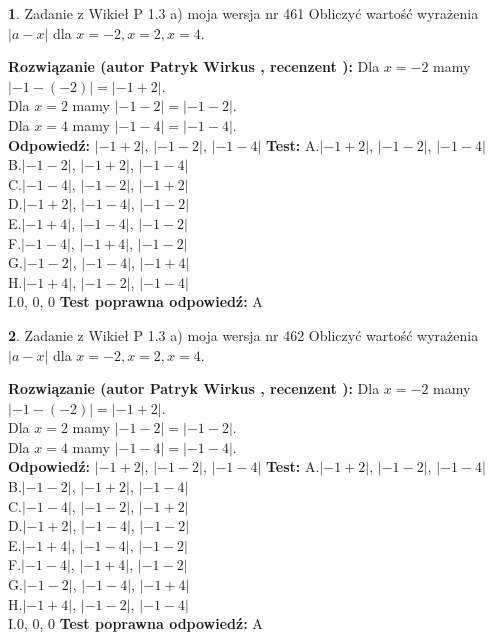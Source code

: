 \documentclass[12pt, a4paper]{article}
\theoremstyle{definition} %
\newtheorem{zad}{}
\newcommand{\zadStart}[1]{\begin{zad}#1\newline}
\newcommand{\zadStop}{\end{zad}}
\newcommand{\rozwStart}[2]{\noindent \textbf{Rozwiązanie (autor #1 , recenzent #2): }\newline}
\newcommand{\rozwStop}{\newline}
\newcommand{\odpStart}{\noindent \textbf{Odpowiedź:}\newline}
\newcommand{\odpStop}{\newline}
\newcommand{\testStart}{\noindent \textbf{Test:}\newline}
\newcommand{\testStop}{\newline}
\newcommand{\kluczStart}{\noindent \textbf{Test poprawna odpowiedź:}\newline}
\newcommand{\kluczStop}{\newline}
\begin{document}
\zadStart{Zadanie z Wikieł P 1.3 a) moja wersja nr 461}
Obliczyć wartość wyrażenia $|a - x|$ dla $x=-2,x=2,x=4$.
\zadStop
\rozwStart{Patryk Wirkus}{}
Dla $x = -2$ mamy $|-1 - (-2)| = |-1 + 2|$.\\
Dla $x = 2$ mamy $|-1 - 2| = |-1 - 2|$.\\
Dla $x = 4$ mamy $|-1 - 4| = |-1 - 4|$.\\
\rozwStop
\odpStart
$|-1 + 2|$, $|-1 - 2|$, $|-1 - 4|$
\odpStop
\testStart
A.$|-1 + 2|$, $|-1 - 2|$, $|-1 - 4|$\\
B.$|-1 - 2|$, $|-1 + 2|$, $|-1 - 4|$\\
C.$|-1 - 4|$, $|-1 - 2|$, $|-1 + 2|$\\
D.$|-1 + 2|$, $|-1 - 4|$, $|-1 - 2|$\\
E.$|-1 + 4|$, $|-1 - 4|$, $|-1 - 2|$\\
F.$|-1 - 4|$, $|-1 + 4|$, $|-1 - 2|$\\
G.$|-1 - 2|$, $|-1 - 4|$, $|-1 + 4|$\\
H.$|-1 + 4|$, $|-1 - 2|$, $|-1 - 4|$\\
I.$0$, $0$, $0$
\testStop
\kluczStart
A
\kluczStop



\zadStart{Zadanie z Wikieł P 1.3 a) moja wersja nr 462}
Obliczyć wartość wyrażenia $|a - x|$ dla $x=-2,x=2,x=4$.
\zadStop
\rozwStart{Patryk Wirkus}{}
Dla $x = -2$ mamy $|-1 - (-2)| = |-1 + 2|$.\\
Dla $x = 2$ mamy $|-1 - 2| = |-1 - 2|$.\\
Dla $x = 4$ mamy $|-1 - 4| = |-1 - 4|$.\\
\rozwStop
\odpStart
$|-1 + 2|$, $|-1 - 2|$, $|-1 - 4|$
\odpStop
\testStart
A.$|-1 + 2|$, $|-1 - 2|$, $|-1 - 4|$\\
B.$|-1 - 2|$, $|-1 + 2|$, $|-1 - 4|$\\
C.$|-1 - 4|$, $|-1 - 2|$, $|-1 + 2|$\\
D.$|-1 + 2|$, $|-1 - 4|$, $|-1 - 2|$\\
E.$|-1 + 4|$, $|-1 - 4|$, $|-1 - 2|$\\
F.$|-1 - 4|$, $|-1 + 4|$, $|-1 - 2|$\\
G.$|-1 - 2|$, $|-1 - 4|$, $|-1 + 4|$\\
H.$|-1 + 4|$, $|-1 - 2|$, $|-1 - 4|$\\
I.$0$, $0$, $0$
\testStop
\kluczStart
A
\kluczStop
\end{document}
